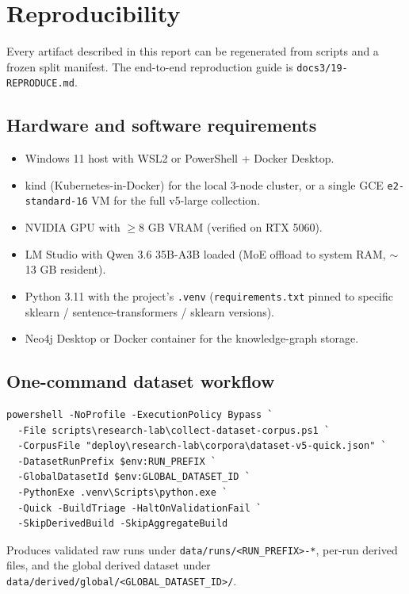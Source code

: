 \section{Reproducibility}
\label{app:repro}

Every artifact described in this report can be regenerated from scripts and a frozen split manifest. The end-to-end reproduction guide is \texttt{docs3/19-REPRODUCE.md}.

\subsection{Hardware and software requirements}

\begin{itemize}
\item Windows 11 host with WSL2 or PowerShell + Docker Desktop.
\item kind (Kubernetes-in-Docker) for the local 3-node cluster, or a single GCE \texttt{e2-standard-16} VM for the full v5-large collection.
\item NVIDIA GPU with $\geq 8$ GB VRAM (verified on RTX 5060).
\item LM Studio with Qwen 3.6 35B-A3B loaded (MoE offload to system RAM, $\sim$13 GB resident).
\item Python 3.11 with the project's \texttt{.venv} (\texttt{requirements.txt} pinned to specific sklearn / sentence-transformers / sklearn versions).
\item Neo4j Desktop or Docker container for the knowledge-graph storage.
\end{itemize}

\subsection{One-command dataset workflow}

\begin{lstlisting}[basicstyle=\ttfamily\footnotesize]
powershell -NoProfile -ExecutionPolicy Bypass `
  -File scripts\research-lab\collect-dataset-corpus.ps1 `
  -CorpusFile "deploy\research-lab\corpora\dataset-v5-quick.json" `
  -DatasetRunPrefix $env:RUN_PREFIX `
  -GlobalDatasetId $env:GLOBAL_DATASET_ID `
  -PythonExe .venv\Scripts\python.exe `
  -Quick -BuildTriage -HaltOnValidationFail `
  -SkipDerivedBuild -SkipAggregateBuild
\end{lstlisting}

Produces validated raw runs under \texttt{data/runs/<RUN\_PREFIX>-*}, per-run derived files, and the global derived dataset under \texttt{data/derived/global/<GLOBAL\_DATASET\_ID>/}.

